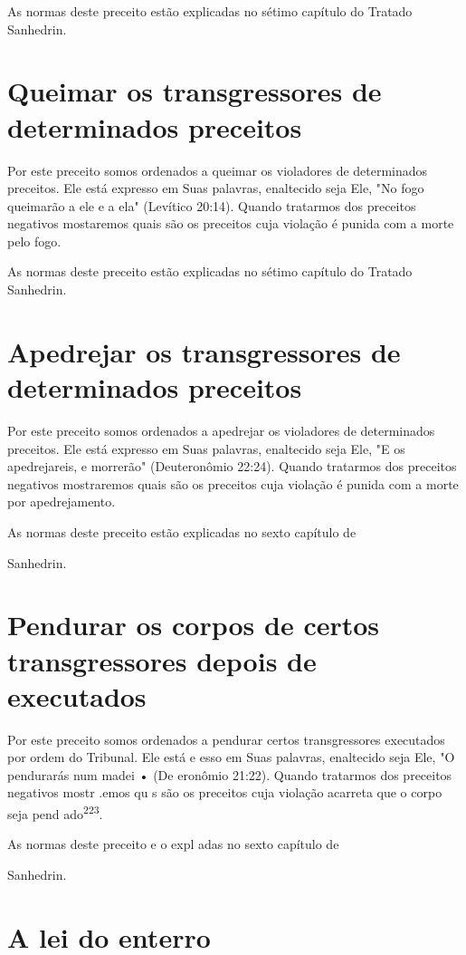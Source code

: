 \begin{itemize}
\begin{enumrate}
\begin{itemize}
\begin{itemize}
\begin{itemize}
As normas deste preceito estão explicadas no sétimo capítulo do Tra­tado
Sanhedrin.

\section{Queimar os transgressores de determinados preceitos}

Por este preceito somos ordenados a queimar os violadores de
de­terminados preceitos. Ele está expresso em Suas palavras, enaltecido
seja Ele, "No fogo queimarão a ele e a ela" (Levítico 20:14). Quando
tratarmos dos pre­ceitos negativos mostaremos quais são os preceitos
cuja violação é punida com a morte pelo fogo.

As normas deste preceito estão explicadas no sétimo capítulo do Tra­tado
Sanhedrin.

\section{Apedrejar os transgressores de determinados preceitos}

Por este preceito somos ordenados a apedrejar os violadores de
de­terminados preceitos. Ele está expresso em Suas palavras, enaltecido
seja Ele, "E os apedrejareis, e morrerão" (Deuteronômio 22:24). Quando
tratarmos dos preceitos negativos mostraremos quais são os preceitos
cuja violação é punida com a morte por apedrejamento.


As normas deste preceito estão explicadas no sexto capítulo de


Sanhedrin.



\section{Pendurar os corpos de certos transgressores depois de executados}

Por este preceito somos ordenados a pendurar certos transgressores
executados por ordem do Tribunal. Ele está e esso em Suas palavras,
enalte­cido seja Ele, "O pendurarás num madei • (De eronômio 21:22).
Quando tratarmos dos preceitos negativos mostr .emos
qu s são os preceitos cuja vio­lação acarreta que o corpo seja pend
ado\textsuperscript{223}.


As normas deste preceito e o expl adas no sexto capítulo de


Sanhedrin.

\section{A lei do enterro}


\end{itemize}
\end{itemize}
\end{itemize}
\end{enumrate}
\end{itemize}
